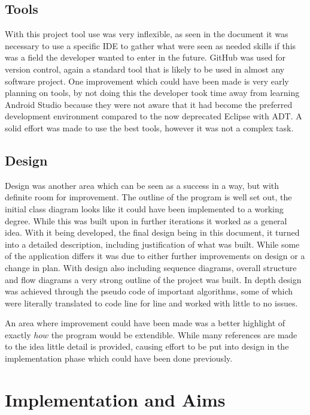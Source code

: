 \subsection{Tools}
With this project tool use was very inflexible, as seen in the document it was necessary to use a specific IDE to gather what were seen as needed skills if this was a field the developer wanted to enter in the future. GitHub was used for version control, again a standard tool that is likely to be used in almost any software project. One improvement which could have been made is very early planning on tools, by not doing this the developer took time away from learning Android Studio because they were not aware that it had become the preferred development environment compared to the now deprecated Eclipse with ADT. A solid effort was made to use the best tools, however it was not a complex task. 
\subsection{Design}
Design was another area which can be seen as a success in a way, but with definite room for improvement. The outline of the program is well set out, the initial class diagram looks like it could have been implemented to a working degree. While this was built upon in further iterations it worked as a general idea. With it being developed, the final design being in this document, it turned into a detailed description, including justification of what was built. While some of the application differs it was due to either further improvements on design or a change in plan. With design also including sequence diagrams, overall structure and flow diagrams a very strong outline of the project was built. In depth design was achieved through the pseudo code of important algorithms, some of which were literally translated to code line for line and worked with little to no issues.

An area where improvement could have been made was a better highlight of exactly $how$ the program would be extendible. While many references are made to the idea little detail is provided, causing effort to be put into design in the implementation phase which could have been done previously. 
\section{Implementation and Aims}
